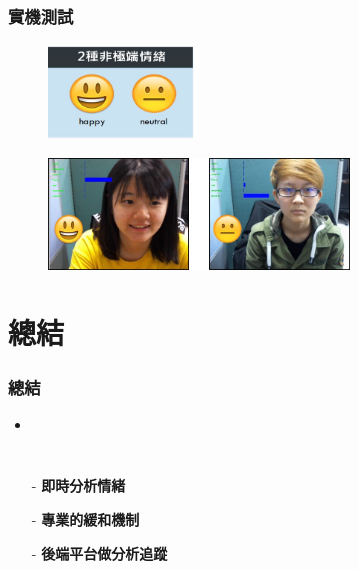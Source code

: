 \documentclass[10pt, conference, compsocconf]{beamer}
\begin{document}
\begin{CJK}{UTF8}{}
\begin{frame}
\end{frame}

\begin{frame}
\frametitle{實機測試}

\begin{figure}[t]
\begin{center}
\includegraphics[width=4cm]{./Figures/510.jpg}
\end{center}
\end{figure}

\vspace{3mm}
\begin{figure}[!t]
\begin{center}
\includegraphics[width=8cm]{./Figures/511.jpg}
\end{center}
\end{figure}

\end{frame}

\section{總結}

\begin{frame}
\frametitle{總結}
\begin{itemize}
\item{}
\end{itemize}

\begin{columns}
\begin{itemize}
\item[-] \Large\bf 即時分析情緒
\vspace{5mm}
\item[-] \Large\bf 專業的緩和機制
\vspace{5mm}
\item[-] \Large\bf 後端平台做分析追蹤
\end{itemize}


\end{columns}
\end{frame}
\end{CJK}
\end{document}
